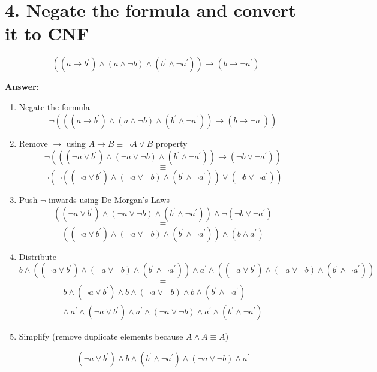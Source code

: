 \documentclass[a4paper, 14pt]{report}
\newcommand{\answer}[1]{%
	\begin{flushleft}
		\textbf{Answer}:\\
			#1
	\end{flushleft}
}
\newcommand{\question}[1]{%
	\section*{%
		#1 
	}
}
\begin{document}
	\question{4. Negate the formula and convert it to CNF} %

	\[ ((a \rightarrow b^\prime) \wedge (a \wedge \neg b) \wedge (b^\prime \wedge \neg a^\prime)) \rightarrow (b \rightarrow \neg a^\prime) \]

	\answer{%
	\begin{enumerate}		

		\item Negate the formula \\
			\[ \neg (((a \rightarrow b^\prime) \wedge (a \wedge \neg b) \wedge (b^\prime \wedge \neg a^\prime)) \rightarrow (b \rightarrow \neg a^\prime)) \] 
	  
		\item Remove $\rightarrow$ using $A \rightarrow B \equiv \neg A \vee B$ property \\
			\[ \neg (((\neg a \vee b^\prime) \wedge (\neg a \vee \neg b) \wedge (b^\prime \wedge \neg a^\prime)) \rightarrow (\neg b \vee \neg a^\prime)) \]  
			\[ \equiv \]
			\[ \neg (\neg ((\neg a \vee b^\prime) \wedge (\neg a \vee \neg b) \wedge (b^\prime \wedge \neg a^\prime)) \vee (\neg b \vee \neg a^\prime)) \] 

		\item Push $\neg$ inwards using De Morgan's Laws
			\[ ((\neg a \vee b^\prime) \wedge (\neg a \vee \neg b) \wedge (b^\prime \wedge \neg a^\prime)) \wedge \neg (\neg b \vee \neg a^\prime) \] 
			\[ \equiv \]
			\[ ((\neg a \vee b^\prime) \wedge (\neg a \vee \neg b) \wedge (b^\prime \wedge \neg a^\prime)) \wedge (b \wedge a^\prime) \] 

		\item Distribute
			\[ b \wedge ((\neg a \vee b^\prime) \wedge (\neg a \vee \neg b) \wedge (b^\prime \wedge \neg a^\prime)) \wedge a^\prime \wedge  ((\neg a \vee b^\prime) \wedge (\neg a \vee \neg b) \wedge (b^\prime \wedge \neg a^\prime)) \] 
			\[ \equiv \]
			\[ 
				\begin{split}
					b \wedge (\neg a \vee b^\prime) \wedge b \wedge (\neg a \vee \neg b) \wedge b \wedge (b^\prime \wedge \neg a^\prime) \\
					\wedge\  
					a^\prime \wedge (\neg a \vee b^\prime) \wedge a^\prime \wedge (\neg a \vee \neg b) \wedge a^\prime \wedge (b^\prime \wedge \neg a^\prime)
			 \end{split}
			\] 

			\item Simplify (remove duplicate elements because $ A \wedge A \equiv A$)

			\[ (\neg a \vee b^\prime) \wedge b \wedge (b^\prime \wedge \neg a^\prime) \wedge (\neg a \vee \neg b) \wedge a^\prime  \] 

	\end{enumerate}		

	\hline
}
\end{document}
